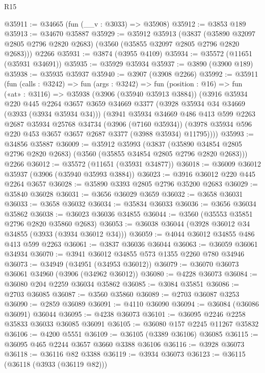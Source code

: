 \begin{lexlean}{R15}
\begin{coremodule}
@35911 := @34665 (fun (__v : @3033) => @35908)
@35912 := @3853 @189
@35913 := @34670 @35887
@35929 := @35912
    @35913
    (@3837 (@35890 @32097 @2805 @2796 @2820 @2683) (@3560 (@35855 @32097 @2805 @2796 @2820 @2683)))
    @2266
@35931 := @3874 (@3955 @4109)
@35934 := @35572 (@11651 (@35931 @34691))
@35935 := @35929 @35934
@35937 := @3890 (@3900 @189)
@35938 := @35935 @35937
@35940 := @3907 (@3908 @2266)
@35992 := @35911
    (fun (calls : @3242) =>
    fun (args : @3242) =>
    fun (position : @16) =>
    fun («at» : @3116) =>
    @35938
      (@3906 (@35940 @35913 @3884))
      (@3916
        @35934
        @220
        @445
        @2264
        @3657
        @3659
        @34669
        @3377
        (@3928 @35934 @34 @34669 (@3933 (@3934 @35934 @34)))
        (@3941
          @35934
          @34669
          @486
          @413
          @599
          @2263
          @2687
          @35934
          @25768
          @34734
          (@3906 (@7160 @35934))
          (@3978 @35934 @596 @220 @453 @3657 @3657 @2687 @3377 (@3988 @35934) @11795))))
@35993 := @34856 @35887
@36009 := @35912
    @35993
    (@3837 (@35890 @34854 @2805 @2796 @2820 @2683) (@3560 (@35855 @34854 @2805 @2796 @2820 @2683)))
    @2266
@36012 := @35572 (@11651 (@35931 @34877))
@36018 := @36009 @36012 @35937 (@3906 (@35940 @35993 @3884))
@36023 := @3916 @36012 @220 @445 @2264 @3657
@36028 := @35890 @3393 @2805 @2796 @35200 @2683
@36029 := @35840 @36028
@36031 := @3656 @36029 @3659
@36032 := @3658 @36031
@36033 := @3658 @36032
@36034 := @35834 @36033
@36036 := @3656 @36034 @35862
@36038 := @36023 @36036 @34855
@36044 := @3560 (@35553 @35851 @2796 @2820 @35860 @2683)
@36053 := @36038 @36044 (@3928 @36012 @34 @34855 (@3933 (@3934 @36012 @34)))
@36059 := @4044 @36012 @34855 @486 @413 @599 @2263
@36061 := @3837 @36036 @36044
@36063 := @36059 @36061 @34934
@36070 := @3941 @36012 @34855 @573 @1355 @2260 @780 @34946
@36073 := @34949 (@34951 (@34953 @36012))
@36079 := @36070 @36073 @36061 @34960 (@3906 (@34962 @36012))
@36080 := @4228 @36073
@36084 := @36080 @204 @2259 @36034 @35862
@36085 := @3084 @35851
@36086 := @2703 @36085
@36087 := @3560 @35860
@36089 := @2703 @36087 @3253
@36090 := @2859 @36089
@36091 := @4110 @36090
@36094 := @36084 (@36086 @36091) @36044
@36095 := @4238 @36073
@36101 := @36095 @2246 @2258 @35833 @36033 @36085 @36091
@36105 := @36080 @157 @2245 @11267 @35832
@36106 := @4200 @5551
@36109 := @36105 (@3389 @36106) @36085
@36115 := @36095 @465 @2244 @3657 @3660 @3388 @36106
@36116 := @3928 @36073
@36118 := @36116 @82 @3388
@36119 := @3934 @36073
@36123 := @36115 (@36118 (@3933 (@36119 @82)))

\end{coremodule}
\end{lexlean}
